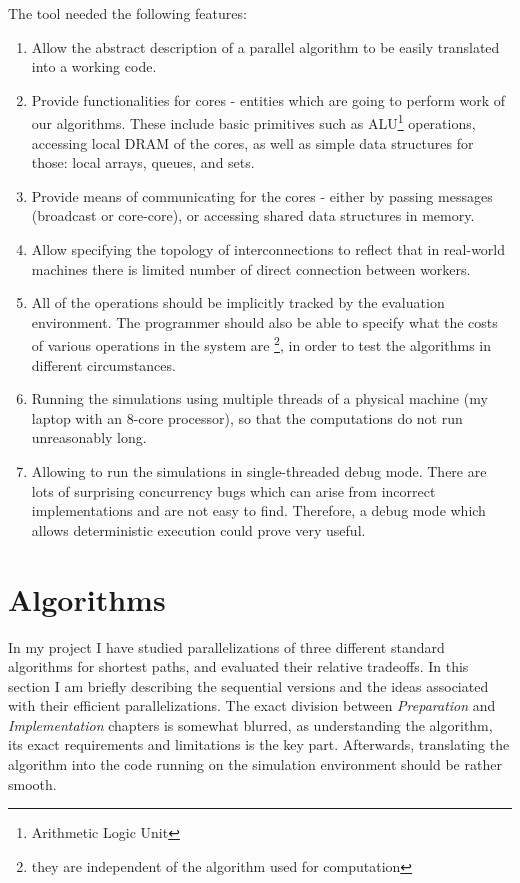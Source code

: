 \documentclass[12pt,a4paper,twoside,openright]{report}
\begin{document}
The tool needed the following features:

\begin{enumerate}
    \item Allow the abstract description of a parallel algorithm to be easily translated into a working code.
    \item Provide functionalities for cores - entities which are going to perform work of our algorithms. These include basic primitives such as ALU\footnote{Arithmetic Logic Unit} operations, accessing local DRAM of the cores, as well as simple data structures for those: local arrays, queues, and sets. 
    \item Provide means of communicating for the cores - either by passing messages (broadcast or core-core), or accessing shared data structures in memory.
    \item Allow specifying the topology of interconnections to reflect that in real-world machines there is limited number of direct connection between workers.
    \item All of the operations should be implicitly tracked by the evaluation environment. The programmer should also be able to specify what the costs of various operations in the system are \footnote{they are independent of the algorithm used for computation}, in order to test the algorithms in different circumstances.
    \item Running the simulations using multiple threads of a physical machine (my laptop with an $8$-core processor), so that the computations do not run unreasonably long.
    \item Allowing to run the simulations in single-threaded debug mode. There are lots of surprising concurrency bugs which can arise from incorrect implementations and are not easy to find. Therefore, a debug mode which allows deterministic execution could prove very useful.
\end{enumerate}

\section{Algorithms}
In my project I have studied parallelizations of three different standard algorithms for shortest paths, and evaluated their relative tradeoffs. In this section I am briefly describing the sequential versions and the ideas associated with their efficient parallelizations. The exact division between \textit{Preparation} and \textit{Implementation} chapters is somewhat blurred, as understanding the algorithm, its exact requirements and limitations is the key part. Afterwards, translating the algorithm into the code running on the simulation environment should be rather smooth.
\end{document}
